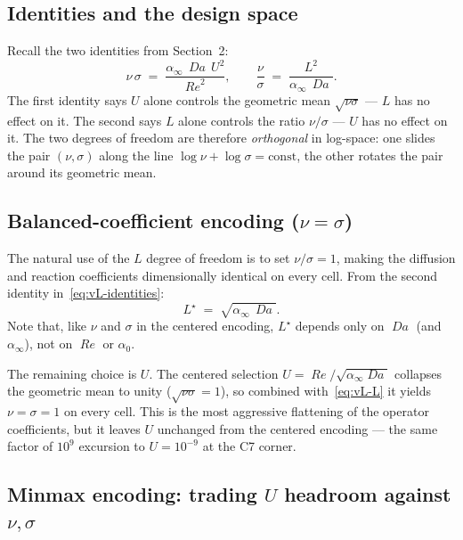 \documentclass[11pt]{article}
\newcommand{\Reyn}{\operatorname{\mathit{Re}}}
\newcommand{\Damk}{\operatorname{\mathit{Da}}}
\begin{document}
\subsection{Identities and the design space}
\label{sec:varL-identities}

Recall the two identities from Section~2:
\begin{equation}
  \nu \, \sigma \;=\; \frac{\alpha_\infty\,\Damk\,U^{2}}{\Reyn^{2}},
  \qquad
  \frac{\nu}{\sigma} \;=\; \frac{L^{2}}{\alpha_\infty\,\Damk}.
  \label{eq:vL-identities}
\end{equation}
The first identity says $U$ alone controls the geometric mean
$\sqrt{\nu\sigma}$ — $L$ has no effect on it. The second says $L$ alone
controls the ratio $\nu/\sigma$ — $U$ has no effect on it. The two
degrees of freedom are therefore \emph{orthogonal} in log-space: one
slides the pair $(\nu, \sigma)$ along the line $\log\nu + \log\sigma =
\mathrm{const}$, the other rotates the pair around its geometric mean.

\subsection{Balanced-coefficient encoding ($\nu = \sigma$)}

The natural use of the $L$ degree of freedom is to set $\nu/\sigma = 1$,
making the diffusion and reaction coefficients dimensionally identical
on every cell. From the second identity in~\eqref{eq:vL-identities}:
\begin{equation}
  L^{\star} \;=\; \sqrt{\alpha_\infty\,\Damk}.
  \label{eq:vL-L}
\end{equation}
Note that, like $\nu$ and $\sigma$ in the centered encoding, $L^\star$
depends only on $\Damk$ (and $\alpha_\infty$), not on $\Reyn$ or
$\alpha_0$.

The remaining choice is $U$. The centered selection
$U = \Reyn / \sqrt{\alpha_\infty \Damk}$ collapses the geometric mean to
unity ($\sqrt{\nu\sigma} = 1$), so combined with~\eqref{eq:vL-L} it
yields $\nu = \sigma = 1$ on every cell. This is the most aggressive
flattening of the operator coefficients, but it leaves $U$ unchanged
from the centered encoding — the same factor of $10^9$ excursion to
$U = 10^{-9}$ at the C7 corner.

\subsection{Minmax encoding: trading $U$ headroom against $\nu, \sigma$}
\end{document}
